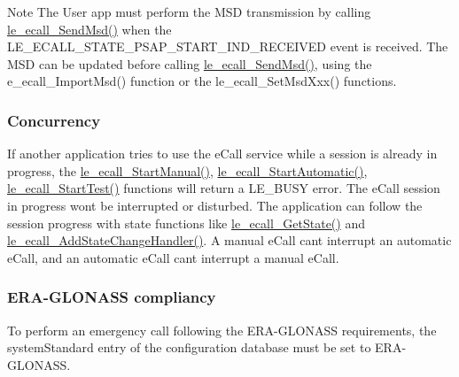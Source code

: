\begin{DoxyNote}{Note}
The User app must perform the M\+S\+D transmission by calling \hyperlink{le__ecall__interface_8h_a344e4c29208e576e81dda113f786529e}{le\+\_\+ecall\+\_\+\+Send\+Msd()} when the L\+E\+\_\+\+E\+C\+A\+L\+L\+\_\+\+S\+T\+A\+T\+E\+\_\+\+P\+S\+A\+P\+\_\+\+S\+T\+A\+R\+T\+\_\+\+I\+N\+D\+\_\+\+R\+E\+C\+E\+I\+V\+E\+D event is received. The M\+S\+D can be updated before calling \hyperlink{le__ecall__interface_8h_a344e4c29208e576e81dda113f786529e}{le\+\_\+ecall\+\_\+\+Send\+Msd()}, using the e\+\_\+ecall\+\_\+\+Import\+Msd() function or the le\+\_\+ecall\+\_\+\+Set\+Msd\+Xxx() functions.
\end{DoxyNote}
\hypertarget{c_ecall_le_ecall_concurrency}{}\subsubsection{Concurrency}\label{c_ecall_le_ecall_concurrency}
If another application tries to use the e\+Call service while a session is already in progress, the \hyperlink{le__ecall__interface_8h_ab106c3ca87fc8dd8239d2849df932122}{le\+\_\+ecall\+\_\+\+Start\+Manual()}, \hyperlink{le__ecall__interface_8h_aa25256eeacefcf00c14763ef294c7667}{le\+\_\+ecall\+\_\+\+Start\+Automatic()}, \hyperlink{le__ecall__interface_8h_aa5d23a1bea370b1ae29fc52d7a89d947}{le\+\_\+ecall\+\_\+\+Start\+Test()} functions will return a L\+E\+\_\+\+B\+U\+S\+Y error. The e\+Call session in progress won\textquotesingle{}t be interrupted or disturbed. The application can follow the session progress with \textquotesingle{}state\textquotesingle{} functions like \hyperlink{le__ecall__interface_8h_a7881e794b9249222edde10f76d7663c9}{le\+\_\+ecall\+\_\+\+Get\+State()} and \hyperlink{le__ecall__interface_8h_a453b64579f2884f1d26981bca38a201c}{le\+\_\+ecall\+\_\+\+Add\+State\+Change\+Handler()}. A manual e\+Call can\textquotesingle{}t interrupt an automatic e\+Call, and an automatic e\+Call can\textquotesingle{}t interrupt a manual e\+Call.\hypertarget{c_ecall_le_ecall_eraglonass}{}\subsubsection{E\+R\+A-\/\+G\+L\+O\+N\+A\+S\+S compliancy}\label{c_ecall_le_ecall_eraglonass}
To perform an emergency call following the E\+R\+A-\/\+G\+L\+O\+N\+A\+S\+S requirements, the \textquotesingle{}system\+Standard\textquotesingle{} entry of the configuration database must be set to \textquotesingle{}E\+R\+A-\/\+G\+L\+O\+N\+A\+S\+S\textquotesingle{}.

